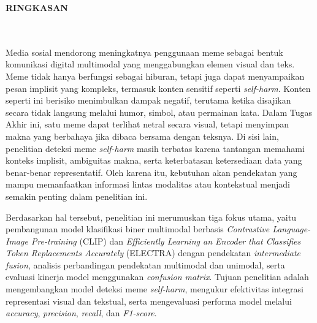 \clearpage
{}%
\pagestyle{alternatingstyle}
\thispagestyle{alternatingstyle}

\begin{center}
	\large \bfseries \MakeUppercase{Ringkasan}\\
	\normalsize \normalfont {\thetitle}\\
	\normalsize \normalfont {\theauthor}\\
	\bigskip
	
	\normalsize \normalfont \justifying
	\normalsize \normalfont \justifying
	 Media sosial mendorong meningkatnya penggunaan meme sebagai bentuk komunikasi digital multimodal yang menggabungkan elemen visual dan teks. Meme tidak hanya berfungsi sebagai hiburan, tetapi juga dapat menyampaikan pesan implisit yang kompleks, termasuk konten sensitif seperti \textit{self-harm}. Konten seperti ini berisiko menimbulkan dampak negatif, terutama ketika disajikan secara tidak langsung melalui humor, simbol, atau permainan kata. Dalam Tugas Akhir ini, satu meme dapat terlihat netral secara visual, tetapi menyimpan makna yang berbahaya jika dibaca bersama dengan teksnya. Di sisi lain, penelitian deteksi meme \textit{self-harm} masih terbatas karena tantangan memahami konteks implisit, ambiguitas makna, serta keterbatasan ketersediaan data yang benar-benar representatif. Oleh karena itu, kebutuhan akan pendekatan yang mampu memanfaatkan informasi lintas modalitas atau kontekstual menjadi semakin penting dalam penelitian ini.
	 
	 Berdasarkan hal tersebut, penelitian ini merumuskan tiga fokus utama, yaitu pembangunan model klasifikasi biner multimodal berbasis \textit{Contrastive Language-Image Pre-training} (CLIP) dan \textit{Efficiently Learning an Encoder that Classifies Token Replacements Accurately} (ELECTRA) dengan pendekatan \textit{intermediate fusion}, analisis perbandingan pendekatan multimodal dan unimodal, serta evaluasi kinerja model menggunakan \textit{confusion matrix}. Tujuan penelitian adalah mengembangkan model deteksi meme \textit{self-harm}, mengukur efektivitas integrasi representasi visual dan tekstual, serta mengevaluasi performa model melalui \textit{accuracy}, \textit{precision}, \textit{recall}, dan \textit{F1-score}.
	 

\end{center}
